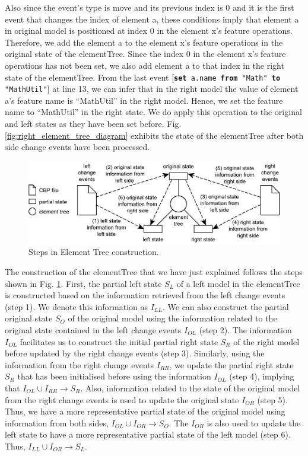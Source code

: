 \documentclass{jot}
\begin{document}
Also since the event's type is \textsf{move} and its previous index is 0 and it is the first event that changes the index of element \textsf{a}, these conditions imply that element \textsf{a} in original model is positioned at index 0 in the element \textsf{x}'s feature \textsf{operations}. Therefore, we add the element \textsf{a} to  the element \textsf{x}'s feature \textsf{operations} in the original state of the \textsf{elementTree}. Since the index 0 in the element \textsf{x}'s feature \textsf{operations} has not been set, we also add element \textsf{a} to that index in the right state of the \textsf{elementTree}. From the last event [\texttt{\small \textbf{set} a.name \textbf{from} "Math" \textbf{to} "MathUtil"}] at line 13, we can infer that in the right model the value of element \textsf{a}'s feature \textsf{name} is ``MathUtil'' in the right model. Hence, we set the feature \textsf{name} to ``MathUtil'' in the right state. We do apply this operation to the original and left states as they have been set before. Fig. \ref{fig:right_element_tree_diagram} exhibits the state of the \textsf{elementTree} after both side change events have been processed.

\begin{figure}
    \centering
    \includegraphics[width=0.7\linewidth]{TreeConstruction}
    \caption{Steps in Element Tree construction.}
    \label{fig:tree_construction}
\end{figure} 

The construction of the \textsf{elementTree} that we have just explained follows the steps shown in Fig. \ref{fig:tree_construction}. First, the partial left state $S_{L}$ of a left model in the \textsf{elementTree} is constructed based on the information retrieved from the left change events (step 1). We denote this information as $I_{LL}$. We can also construct the partial original state $S_{O}$ of the original model using the information related to the original state contained in the left change events $I_{OL}$ (step 2). The information $I_{OL}$ facilitates us to construct the initial partial right state $S_{R}$ of the right model before updated by the right change events (step 3). Similarly, using the information from the right change events $I_{RR}$, we update the partial right state $S_{R}$ that has been initialised before using the information $I_{OL}$ (step 4), implying that $I_{OL} \cup I_{RR} \rightarrow S_{R}$. Also, information related to the state of the original model from the right change events is used to update the original state $I_{OR}$ (step 5). Thus, we have a more representative partial state of the original model using information from both sides, $I_{OL} \cup I_{OR} \rightarrow S_{O}$. The $I_{OR}$ is also used to update the left state to have a more representative partial state of the left model (step 6). Thus,  $I_{LL} \cup I_{OR} \rightarrow S_{L}$.  
\end{document}
